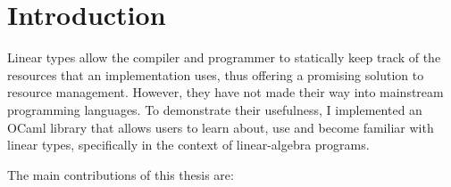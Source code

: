 \chapter{Introduction}


% 
% 

Linear types allow the compiler and programmer to statically keep track of the
resources that an implementation uses, thus offering a promising solution to
resource management. However, they have not made their way into mainstream
programming languages. To demonstrate their usefulness, I implemented an OCaml
library that allows users to learn about, use and become familiar with linear
types, specifically in the context of linear-algebra programs.

The main contributions of this thesis are:

